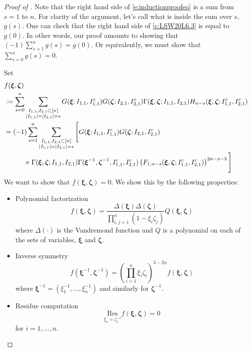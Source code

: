 \documentclass[a4paper,11pt]{article}
\theoremstyle{definition}
\begin{document}
\begin{proof}[Proof of ]
Note that the right hand side of \eqref{e:inductionproofeq} is a sum from $s=1$ to $n$. For clarity of the argument, let's call what is inside the sum over $s$, $g(s)$. One can check that the right hand side of \eqref{c:LSW20L6.3} is equal to $g(0)$. In other words, our proof amounts to showing that $(-1)\sum_{s=1}^ng(s)=g(0)$. Or equivalently, we must show that $\sum_{s=0}^ng(s)=0$.

Set
\begin{equation}\label{e:inductionproofeqV2}
    \begin{split}
    &f(\boldsymbol{\xi}, \boldsymbol{\zeta})\\
    &:=\sum_{s=0}^n\sum_{\substack{I_{1,1},I_{2,1}\subset[n]\\|I_{1,1}|=|I_{2,1}|=s}}G(\boldsymbol{\xi};I_{1,1},I_{1,1}^c)G(\boldsymbol{\zeta};I_{2,1},I_{2,1}^c)\Gamma(\boldsymbol{\xi},\boldsymbol{\zeta};I_{1,1},I_{2,1})H_{n-s}(\boldsymbol{\xi},\boldsymbol{\zeta};I_{1,1}^c,I_{2,1}^c)\\
    &= (-1)\sum_{s=1}^n\sum_{\substack{I_{1,1},I_{2,1}\subset[n]\\|I_{1,1}|=|I_{2,1}|=s}}\Bigg[G(\boldsymbol{\xi};I_{1,1},I_{1,1}^c)G(\boldsymbol{\zeta};I_{2,1},I_{2,1}^c)\\
    &\hspace{10mm}\times\Gamma(\boldsymbol{\xi},\boldsymbol{\zeta};I_{1,1},I_{2,1})\Gamma(\boldsymbol{\xi}^{-1}, \boldsymbol{\zeta}^{-1}, I_{1,1}^c, I_{2,1}^c) \left(F_{1, n-s}(\boldsymbol{\xi}, \boldsymbol{\zeta}; I_{1,1}^c, I_{2,1}^c)\right)^{2n-s-3}\Bigg]
    \end{split}
    \end{equation}
We want to show that $f(\boldsymbol{\xi}, \boldsymbol{\zeta})=0$. We show this by the following properties:
\begin{itemize}
    \item Polynomial factorization
    \begin{equation}
        f(\boldsymbol{\xi}, \boldsymbol{\zeta}) = \frac{\Delta(\boldsymbol{\xi})\Delta(\boldsymbol{\zeta})}{\prod_{i, j=1}^n (1 - \xi_i \zeta_j)} Q(\boldsymbol{\xi}, \boldsymbol{\zeta})
    \end{equation}
    where $\Delta(\cdot)$ is the Vandremond function and $Q$ is a polynomial on each of the sets of variables, $\boldsymbol{\xi}$ and $\boldsymbol{\zeta}$.
    \item Inverse symmetry 
    \begin{equation}
        f(\boldsymbol{\xi}^{-1}, \boldsymbol{\zeta}^{-1}) = \left(\prod_{i=1}^n\xi_i \zeta_i\right)^{3-2n}f(\boldsymbol{\xi}, \boldsymbol{\zeta})
    \end{equation}
    where $\boldsymbol{\xi}^{-1}= (\xi_1^{-1}, \dots, \xi_n^{-1})$ and similarly for $\boldsymbol{\zeta}^{-1}$.
    \item Residue computation
    \begin{equation}
        \underset{\xi_n = \zeta_i^{-1}}{\mathrm{Res}} f(\boldsymbol{\xi}, \boldsymbol{\zeta}) = 0
    \end{equation}
    for $i =1, \dots, n$.
\end{itemize}


\end{proof}
\end{document}
